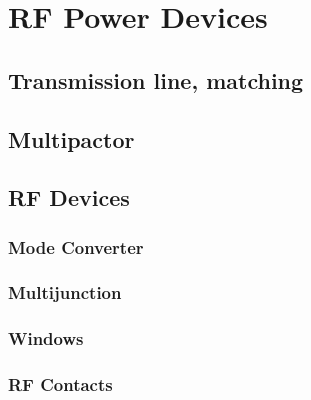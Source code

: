 \chapter{RF Power Devices}

\section{Transmission line, matching}

\section{Multipactor}

\section{RF Devices}

\subsection{Mode Converter}
\subsection{Multijunction}
\subsection{Windows}
\subsection{RF Contacts}
